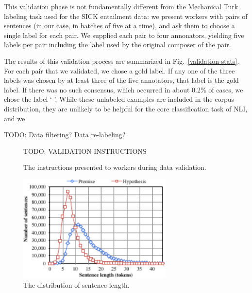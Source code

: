 This validation phase is not fundamentally different from the Mechanical Turk labeling task used for the SICK entailment data: we present workers with pairs of sentences (in our case, in batches of five at a time), and ask them to choose a single label for each pair. We supplied each pair to four annonators, yielding five labels per pair including the label used by the original composer of the pair. 

The results of this validation process are summarized in Fig.~\ref{validation-stats}. For each pair that we validated, we chose a gold label. If any one of the three labels was chosen by at least three of the five annotators, that label is the gold label. If there was no such consensus, which occurred in about 0.2\% of cases, we chose the label `-'. While these unlabeled examples are included in the corpus distribution, they are unlikely to be helpful for the core classification task of NLI, and we 

TODO: Data filtering? Data re-labeling?

\begin{figure}
\footnotesize
TODO: VALIDATION INSTRUCTIONS

\caption{\label{instructions-2}The instructions presented to workers during data validation.}
\end{figure}

\begin{figure}
\center
\includegraphics[width=3.05in]{length_dist}
\caption{\label{b-table}The distribution of sentence length.} 
\end{figure}


